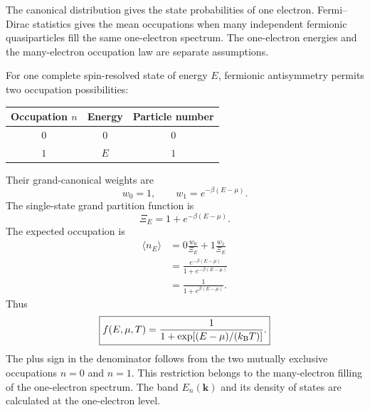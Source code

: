 \begin{boundarybox}
The canonical distribution gives the state probabilities of one electron.
Fermi--Dirac statistics gives the mean occupations when many independent
fermionic quasiparticles fill the same one-electron spectrum.  The one-electron
energies and the many-electron occupation law are separate assumptions.
\end{boundarybox}

For one complete spin-resolved state of energy $E$, fermionic antisymmetry
permits two occupation possibilities:
\begin{center}
  \begin{tabular}{ccc}
    \toprule
    Occupation $n$ & Energy & Particle number \\
    \midrule
    $0$ & $0$ & $0$ \\
    $1$ & $E$ & $1$ \\
    \bottomrule
  \end{tabular}
\end{center}
Their grand-canonical weights are
\begin{equation}
  w_0=1,
  \qquad
  w_1=e^{-\beta(E-\mu)}.
  \label{eq:single-state-grand-weights}
\end{equation}
The single-state grand partition function is
\begin{equation}
  \Xi_E=1+e^{-\beta(E-\mu)}.
  \label{eq:single-state-grand-partition-statmech}
\end{equation}
The expected occupation is
\begin{equation}
\begin{aligned}
  \langle n_E\rangle
  &=0\frac{w_0}{\Xi_E}+1\frac{w_1}{\Xi_E}\\
  &=\frac{e^{-\beta(E-\mu)}}
          {1+e^{-\beta(E-\mu)}}\\
  &=\frac{1}{1+e^{\beta(E-\mu)}}.
\end{aligned}
  \label{eq:fermi-dirac-from-partition-function}
\end{equation}
Thus
\begin{equation}
  \boxed{
  f(E,\mu,T)
  =\frac{1}{1+\exp[(E-\mu)/(k_{\mathrm B} T)]}.
  }
  \label{eq:fermi-dirac-statistical-derivation}
\end{equation}
The plus sign in the denominator follows from the two mutually exclusive
occupations $n=0$ and $n=1$.  This restriction belongs to the many-electron filling of the one-electron
spectrum.  The band $E_n(\bm k)$ and its density of states are calculated at the
one-electron level.

